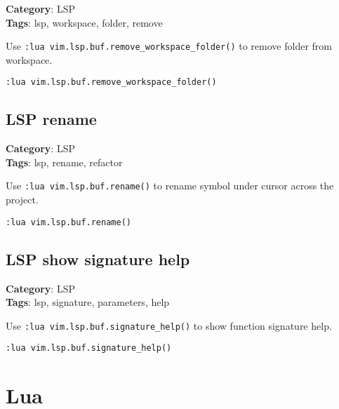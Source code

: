 {{{{{{\textbf{Category}: LSP\\ \textbf{Tags}: lsp, workspace, folder, remove
\vspace{0.5cm}

Use {\footnotesize \Verb§:lua vim.lsp.buf.remove_workspace_folder()§} to remove folder from workspace.

\begin{Exa*}{}
\begin{Verbatim}[fontsize=\footnotesize, breaklines, breakanywhere]
:lua vim.lsp.buf.remove_workspace_folder()
\end{Verbatim}
\end{Exa*}

\section{LSP rename}

\textbf{Category}: LSP\\ \textbf{Tags}: lsp, rename, refactor
\vspace{0.5cm}

Use {\footnotesize \Verb§:lua vim.lsp.buf.rename()§} to rename symbol under cursor across the project.

\begin{Exa*}{}
\begin{Verbatim}[fontsize=\footnotesize, breaklines, breakanywhere]
:lua vim.lsp.buf.rename()
\end{Verbatim}
\end{Exa*}

\section{LSP show signature help}

\textbf{Category}: LSP\\ \textbf{Tags}: lsp, signature, parameters, help
\vspace{0.5cm}

Use {\footnotesize \Verb§:lua vim.lsp.buf.signature_help()§} to show function signature help.

\begin{Exa*}{}
\begin{Verbatim}[fontsize=\footnotesize, breaklines, breakanywhere]
:lua vim.lsp.buf.signature_help()
\end{Verbatim}
\end{Exa*}

\chapter{Lua}
}}}}}}

